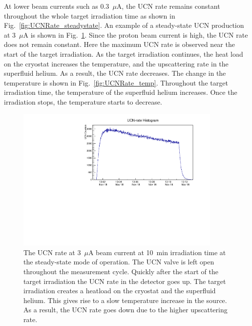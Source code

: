 At lower beam currents such as 0.3~$\mu$A, the UCN rate remains
constant throughout the whole target irradiation time as shown in
Fig.~\ref{fig:UCNRate_steadystate}. An example of a steady-state UCN
production at 3~$\mu$A is shown in
Fig.~\ref{fig:UCNRate_steadystate_highbeam}. Since the proton beam
current is high, the UCN rate does not remain constant. Here the
maximum UCN rate is observed near the start of the target
irradiation. As the target irradiation continues, the heat load on the
cryostat increases the temperature, and the upscattering rate in the
superfluid helium. As a result, the UCN rate decreases. The change in
the temperature is shown in Fig.~\ref{fig:UCNRate_temp}. Throughout
the target irradiation time, the temperature of the superfluid helium
increases. Once the irradiation stops, the temperature starts to
decrease.


\begin{figure}[h!]
  \centering
  \includegraphics[width=0.9\textwidth]{654_UCNRate.pdf}
  \caption{The UCN rate at 3~$\mu$A beam current at 10~min irradiation
    time at the steady-state mode of operation. The UCN valve is left
    open throughout the measurement cycle. Quickly after the start of
    the target irradiation the UCN rate in the detector goes up. The
    target irradiation creates a heatload on the cryostat and the
    superfluid helium. This gives rise to a slow temperature increase
    in the source. As a result, the UCN rate goes down due to the
    higher upscattering rate.  }
  \label{fig:UCNRate_steadystate_highbeam}
\end{figure}

